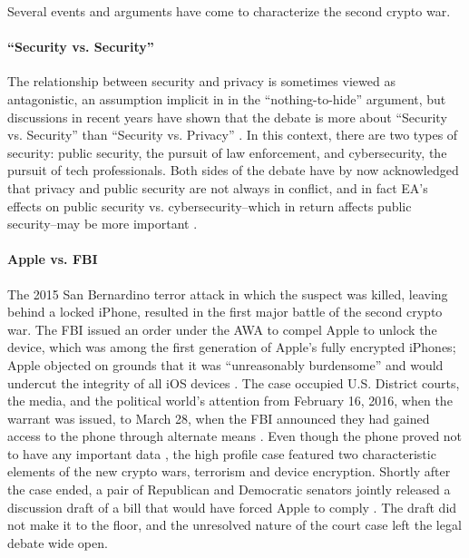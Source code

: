 Several events and arguments have come to characterize the second crypto war.

\paragraph*{``Security vs. Security''} The relationship between security and privacy is sometimes viewed as
antagonistic, an assumption implicit in in the ``nothing-to-hide'' argument, but discussions in recent years have shown
that the debate is more about ``Security vs. Security'' than ``Security vs. Privacy''
\cite{stalla_bourdillon_privacy_2014}. In this context, there are two types of security: public security, the pursuit of
law enforcement, and cybersecurity, the pursuit of tech professionals. Both sides of the debate have by now acknowledged
that privacy and public security are not always in conflict, and in fact \ac{EA}'s effects on public security vs.
cybersecurity--which in return affects public security--may be more important \cite{schneier_2019}.

\paragraph*{Apple vs. FBI} The 2015 San Bernardino terror attack in which the suspect was killed, leaving behind a
locked iPhone, resulted in the first major battle of the second crypto war. The \ac{FBI} issued an order under the
\acrlong{AWA} to compel Apple to unlock the device, which was among the first generation of Apple's fully encrypted
iPhones; Apple objected on grounds that it was ``unreasonably burdensome'' and would undercut the integrity of all iOS
devices \cite{schulze_clipper_2017}. The case occupied U.S. District courts, the media, and the political world's
attention from February 16, 2016, when the warrant was issued, to March 28, when the \ac{FBI} announced they had gained
access to the phone through alternate means \cite{novet_2016}. Even though the phone proved not to have any important
data \cite{schulze_clipper_2017}, the high profile case featured two characteristic elements of the new crypto wars,
terrorism and device encryption. Shortly after the case ended, a pair of Republican and Democratic senators jointly
released a discussion draft of a bill that would have forced Apple to comply \cite{burr_2016}. The draft did not make it
to the floor, and the unresolved nature of the court case left the legal debate wide open.


